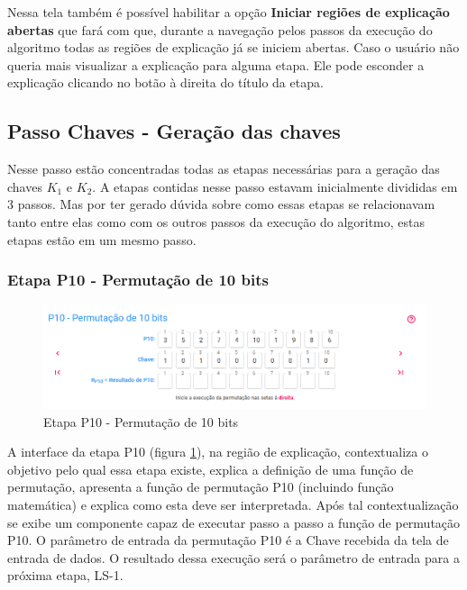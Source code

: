 Nessa tela também é possível habilitar a opção \textbf{Iniciar regiões de explicação abertas} que fará com que, durante a navegação pelos passos da execução do algoritmo todas as regiões de explicação já se iniciem abertas. Caso o usuário não queria mais visualizar a explicação para alguma etapa. Ele pode esconder a explicação clicando no botão à direita do título da etapa.

\subsection{Passo Chaves - Geração das chaves}

Nesse passo estão concentradas todas as etapas necessárias para a geração das chaves \(K_1\) e \(K_2\). A etapas contidas nesse passo estavam inicialmente divididas em 3 passos. Mas por ter gerado dúvida sobre como essas etapas se relacionavam tanto entre elas como com os outros passos da execução do algoritmo, estas etapas estão em um mesmo passo.

\subsubsection{Etapa P10 - Permutação de 10 bits}

\begin{figure}[H]
    \centering
    \caption{Etapa P10 - Permutação de 10 bits}
    \label{fig:uip10}
    \includegraphics[width=1\linewidth]{UI/UIP10.png}
\end{figure}

A interface da etapa P10 (figura \ref{fig:uip10}), na região de explicação, contextualiza o objetivo pelo qual essa etapa existe, explica a definição de uma função de permutação, apresenta a função de permutação P10 (incluindo função matemática) e explica como esta deve ser interpretada. Após tal contextualização se exibe um componente capaz de executar passo a passo a função de permutação P10. O parâmetro de entrada da permutação P10 é a Chave recebida da tela de entrada de dados. O resultado dessa execução será o parâmetro de entrada para a próxima etapa, LS-1.

